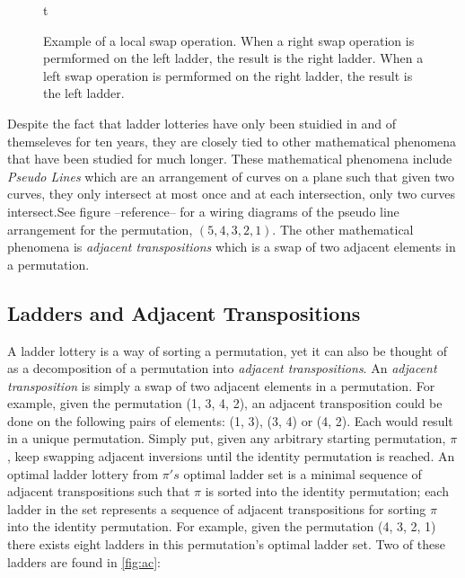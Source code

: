 \begin{figure}[!htp]
\begin{minipage}{0.4\textwidth}
\begin{flushright}
		\end{flushright}
	\end{minipage}t
	\caption{Example of a local swap operation. When a right swap operation is permformed
	on the left ladder, the result is the right ladder. When a left swap operation is permformed
	on the right ladder, the result is the left ladder.}
\end{figure}








Despite the fact that ladder lotteries have only been stuidied in and
of themseleves for ten years, they are closely tied to other mathematical 
phenomena that have been studied for much longer. These mathematical phenomena  
 include \emph{Pseudo Lines} which are an arrangement of 
curves on a plane such that given two curves, they only intersect 
at most once and at each intersection, only two curves intersect.See figure --reference--
for a wiring diagrams of the pseudo line arrangement for the 
permutation, $(5,4,3,2,1)$. The other mathematical phenomena is \emph{adjacent transpositions}
which is a swap of two adjacent elements in a permutation. 
\subsection{Ladders and Adjacent Transpositions}
A ladder lottery is a way of sorting a permutation, yet it can also be thought of as 
a decomposition of a permutation into \emph{adjacent transpositions}. \cite{A1} 
An \emph{adjacent transposition} is simply a swap of two adjacent elements in a 
permutation. For example, given the permutation (1, 3, 4, 2), an adjacent 
transposition could be done on the following pairs of elements: 
(1, 3), (3, 4) or (4, 2). Each would result in a unique permutation. 
Simply put, given any arbitrary starting permutation, $\pi$, keep swapping 
adjacent inversions until the identity permutation is reached.  An optimal 
ladder lottery from $\pi's$ optimal ladder set is a minimal sequence of 
adjacent transpositions such that $\pi$ is sorted into the identity permutation; 
each ladder in the set represents a sequence of adjacent transpositions for 
sorting $\pi$ into the identity permutation. For example, given the permutation 
(4, 3, 2, 1) there exists eight ladders in this permutation's optimal ladder set. 
Two of these ladders are found in \ref{fig:ac}:

